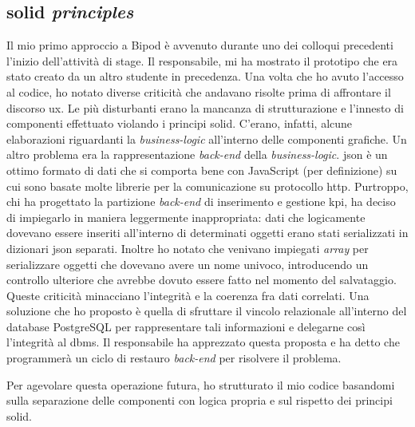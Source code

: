 \subsection{\gls{solid} \textit{principles}}
Il mio primo approccio a Bipod è avvenuto durante uno dei colloqui precedenti l'inizio dell'attività di stage. Il responsabile, mi ha mostrato il prototipo che era stato creato da un altro studente in precedenza. Una volta che ho avuto l'accesso al codice, ho notato diverse criticità che andavano risolte prima di affrontare il discorso \acrshort{ux}. Le più disturbanti erano la mancanza di strutturazione e l'innesto di componenti effettuato violando i principi \gls{solid}\glsfirstoccur.
C'erano, infatti, alcune elaborazioni riguardanti la \textit{business-logic} all'interno delle componenti grafiche.
Un altro problema era la rappresentazione \textit{back-end} della \textit{business-logic}. \acrshort{json} è un ottimo formato di dati che si comporta bene con JavaScript (per definizione) su cui sono basate molte librerie per la comunicazione su protocollo \acrshort{http}.
Purtroppo, chi ha progettato la partizione \textit{back-end} di inserimento e gestione \acrshort{kpi}, ha deciso di impiegarlo in maniera leggermente inappropriata: dati che logicamente dovevano essere inseriti all'interno di determinati oggetti erano stati serializzati in dizionari \acrshort{json} separati. Inoltre ho notato che venivano impiegati \textit{array} per serializzare oggetti che dovevano avere un nome univoco, introducendo un controllo ulteriore che avrebbe dovuto essere fatto nel momento del salvataggio. Queste criticità minacciano l'integrità e la coerenza fra dati correlati. Una soluzione che ho proposto è quella di sfruttare il vincolo relazionale all'interno del database PostgreSQL per rappresentare tali informazioni e delegarne così l'integrità al \acrshort{dbms}. Il responsabile ha apprezzato questa proposta e ha detto che programmerà un ciclo di restauro \textit{back-end} per risolvere il problema.

Per agevolare questa operazione futura, ho strutturato il mio codice basandomi sulla separazione delle componenti con logica propria e sul rispetto dei principi \gls{solid}.

